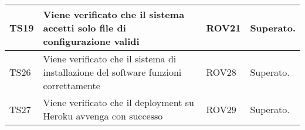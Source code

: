 \begin{center}
\begin{longtable}{|p{2cm}|p{7cm}|p{2cm}|p{2cm}|}
\midrule
TS19
& Viene verificato che il sistema accetti solo file di configurazione validi
& ROV21
& Superato.\\


\midrule
TS26
& Viene verificato che il sistema di installazione del software funzioni correttamente
& ROV28
& Superato.\\


\midrule
TS27
& Viene verificato che il deployment su Heroku avvenga con successo
& ROV29
& Superato.\\








\end{longtable}
\end{center}

